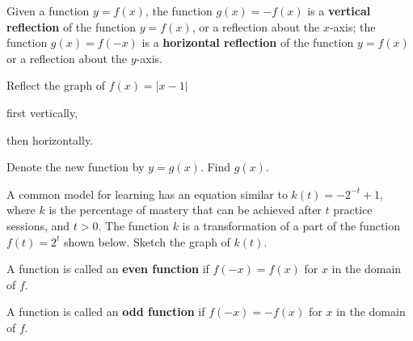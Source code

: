 \newpage

\begin{definition}
  Given a function \(y=f(x)\), the function \(g(x)=-f(x)\) is a \textbf{vertical reflection} of the function \(y=f(x)\), or a reflection about the $x$-axis;
the function \(g(x)=f(-x)\) is a \textbf{horizontal reflection} of the function \(y=f(x)\) or a reflection about the $y$-axis.
\end{definition}

\begin{example}
  Reflect the graph of \(f(x)=|x-1|\)\\
  \begin{enumerate*}
    \item first vertically,
    \item then horizontally.\hfill\mbox{}
  \end{enumerate*}

Denote the new function by $y=g(x)$. Find $g(x)$.
\end{example}

\begin{example}
  A common model for learning has an equation similar to \(k(t)=-2^{-t}+1\), where \(k\) is the percentage of mastery that can be achieved after \(t\) practice sessions, and $t>0$. The function $k$ is a transformation of a part of the function \(f(t)=2^t\) shown below. Sketch the graph of \(k(t)\).\\

\end{example}
\vspace*{-0.3\textheight}

\newpage

\begin{definition}
  A function is called an \textbf{even function} if $f(-x)=f(x)$ for $x$ in the domain of $f$.
  
  A function is called an \textbf{odd function} if $f(-x)=-f(x)$ for $x$ in the domain of $f$.
\end{definition}

